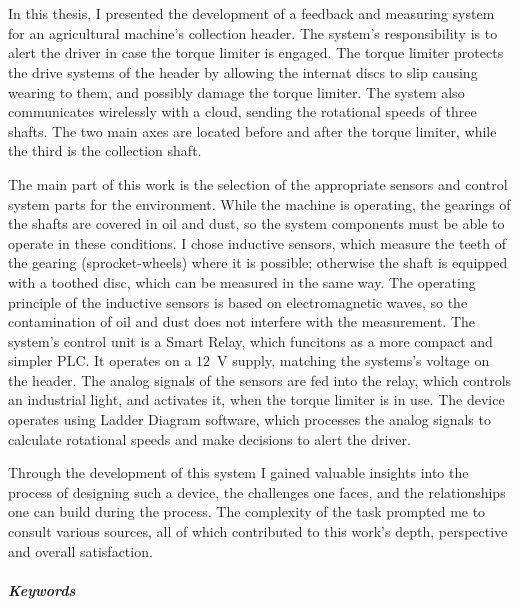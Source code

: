 \chapter*{\summary}

\selectforeignlanguage %

In this thesis, I presented the development of a feedback and measuring system for an agricultural machine's collection header. The system's responsibility is to alert the driver in case the torque limiter is engaged. The torque limiter protects the drive systems of the header by allowing the internat discs to slip causing wearing to them, and possibly damage the torque limiter. The system also communicates wirelessly with a cloud, sending the rotational speeds of three shafts. The two main axes are located before and after the torque limiter, while the third is the collection shaft.

The main part of this work is the selection of the appropriate sensors and control system parts for the environment. While the machine is operating, the gearings of the shafts are covered in oil and dust, so the system components must be able to operate in these conditions. I chose inductive sensors, which measure the teeth of the gearing (sprocket-wheels) where it is possible; otherwise the shaft is equipped with a toothed disc, which can be measured in the same way. The operating principle of the inductive sensors is based on electromagnetic waves, so the contamination of oil and dust does not interfere with the measurement. The system's control unit is a Smart Relay, which funcitons as a more compact and simpler PLC. It operates on a $12$~V supply, matching the systems's voltage on the header. The analog signals of the sensors are fed into the relay, which controls an industrial light, and activates it, when the torque limiter is in use. The device operates using Ladder Diagram software, which processes the analog signals to calculate rotational speeds and make decisions to alert the driver.

Through the development of this system I gained valuable insights into the process of designing such a device, the challenges one faces, and the relationships one can build during the process. The complexity of the task prompted me to consult various sources, all of which contributed to this work's depth, perspective and overall satisfaction.

\vspace{0.5cm}
\paragraph{Keywords} \emph{\keywords}  %


\selectthesislanguage %
